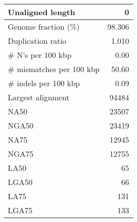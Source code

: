 \documentclass[12pt,a4paper]{article}
\begin{document}
\begin{table}[ht]
\begin{center}
\begin{tabular}{|l*{1}{|r}|}
Unaligned length & 0 \\ \hline
Genome fraction (\%) & 98.306 \\ \hline
Duplication ratio & 1.010 \\ \hline
\# N's per 100 kbp & 0.00 \\ \hline
\# mismatches per 100 kbp & 50.60 \\ \hline
\# indels per 100 kbp & 0.09 \\ \hline
Largest alignment & 94484 \\ \hline
NA50 & 23507 \\ \hline
NGA50 & 23419 \\ \hline
NA75 & 12945 \\ \hline
NGA75 & 12755 \\ \hline
LA50 & 65 \\ \hline
LGA50 & 66 \\ \hline
LA75 & 131 \\ \hline
LGA75 & 133 \\ \hline
\end{tabular}
\end{center}
\end{table}
\end{document}
